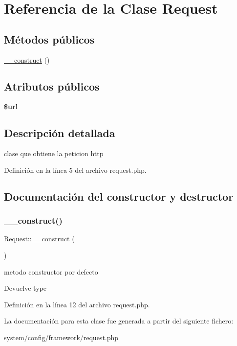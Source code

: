 \hypertarget{class_request}{}\section{Referencia de la Clase Request}
\label{class_request}
\subsection*{Métodos públicos}
\begin{DoxyCompactItemize}
\item 
\mbox{\hyperlink{class_request_a384a81873068495b6ebb552764136611}{\+\_\+\+\_\+construct}} ()
\end{DoxyCompactItemize}
\subsection*{Atributos públicos}
\begin{DoxyCompactItemize}
\item 
\mbox{\label{class_request_a2f93bd61bb0609304eeba0dfa68d1708}} 
{\bfseries \$url}
\end{DoxyCompactItemize}


\subsection{Descripción detallada}
clase que obtiene la peticion http 

Definición en la línea 5 del archivo request.\+php.



\subsection{Documentación del constructor y destructor}
\mbox{\label{class_request_a384a81873068495b6ebb552764136611}} 
\subsubsection{\texorpdfstring{\_\_construct()}{\_\_construct()}}
{\footnotesize\ttfamily Request\+::\+\_\+\+\_\+construct (\begin{DoxyParamCaption}{ }\end{DoxyParamCaption})}

metodo constructor por defecto

\begin{DoxyReturn}{Devuelve}
type 
\end{DoxyReturn}


Definición en la línea 12 del archivo request.\+php.



La documentación para esta clase fue generada a partir del siguiente fichero\+:\begin{DoxyCompactItemize}
\item 
system/config/framework/request.\+php\end{DoxyCompactItemize}
